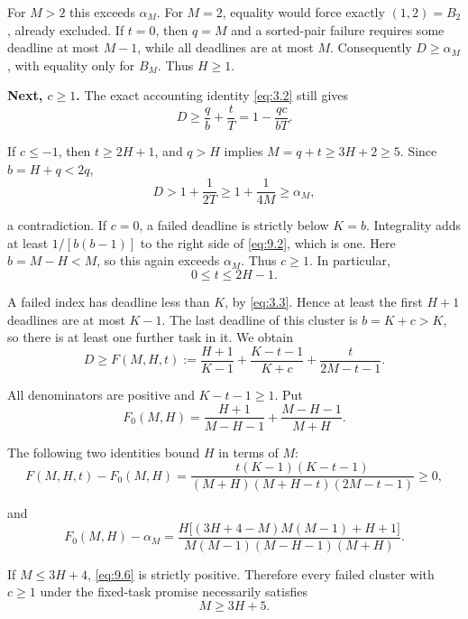 \documentclass[11pt,a4paper]{article}
\begin{document}
For \(M>2\) this exceeds \(\alpha_M\). For \(M=2\), equality would force exactly \((1,2)=B_2\), already excluded. If \(t=0\), then \(q=M\) and a sorted-pair failure requires some deadline at most \(M-1\), while all deadlines are at most \(M\). Consequently \(D\ge \alpha_M\), with equality only for \(B_M\). Thus \(H\ge 1\).

\textbf{Next, \(c\ge 1\).} The exact accounting identity \eqref{eq:3.2} still gives
\begin{equation}
D\ge\frac qb+\frac tT=1-\frac{qc}{bT}.
\tag{9.2}
\label{eq:9.2}
\end{equation}

If \(c\le -1\), then \(t\ge 2H+1\), and \(q>H\) implies \(M=q+t\ge 3H+2\ge 5\). Since \(b=H+q<2q\),
\[
 D>1+\frac1{2T}\ge1+\frac1{4M}\ge\alpha_M,
\]

a contradiction. If \(c=0\), a failed deadline is strictly below \(K=b\). Integrality adds at least \(1/[b(b-1)]\) to the right side of \eqref{eq:9.2}, which is one. Here \(b=M-H<M\), so this again exceeds \(\alpha_M\). Thus \(c\ge 1\). In particular,
\begin{equation}
0\le t\le2H-1.
\tag{9.3}
\label{eq:9.3}
\end{equation}

A failed index has deadline less than \(K\), by \eqref{eq:3.3}. Hence at least the first \(H+1\) deadlines are at most \(K-1\). The last deadline of this cluster is \(b=K+c>K\), so there is at least one further task in it. We obtain
\begin{equation}
D\ge F(M,H,t):=
 \frac{H+1}{K-1}+\frac{K-t-1}{K+c}
 +\frac{t}{2M-t-1}.
\tag{9.4}
\label{eq:9.4}
\end{equation}

All denominators are positive and \(K-t-1\ge 1\). Put
\[
 F_0(M,H)=\frac{H+1}{M-H-1}
              +\frac{M-H-1}{M+H}.
\]

The following two identities bound \(H\) in terms of \(M\):
\begin{equation}
F(M,H,t)-F_0(M,H)
 =\frac{t(K-1)(K-t-1)}
 {(M+H)(M+H-t)(2M-t-1)}\ge0,
\tag{9.5}
\label{eq:9.5}
\end{equation}

and
\begin{equation}
F_0(M,H)-\alpha_M
 =\frac{H\bigl[(3H+4-M)M(M-1)+H+1\bigr]}
 {M(M-1)(M-H-1)(M+H)}.
\tag{9.6}
\label{eq:9.6}
\end{equation}

If \(M\le 3H+4\), \eqref{eq:9.6} is strictly positive. Therefore every failed cluster with \(c\ge 1\) under the fixed-task promise necessarily satisfies
\begin{equation}
\boxed{M\ge3H+5.}
\tag{9.7}
\label{eq:9.7}
\end{equation}
\end{document}
